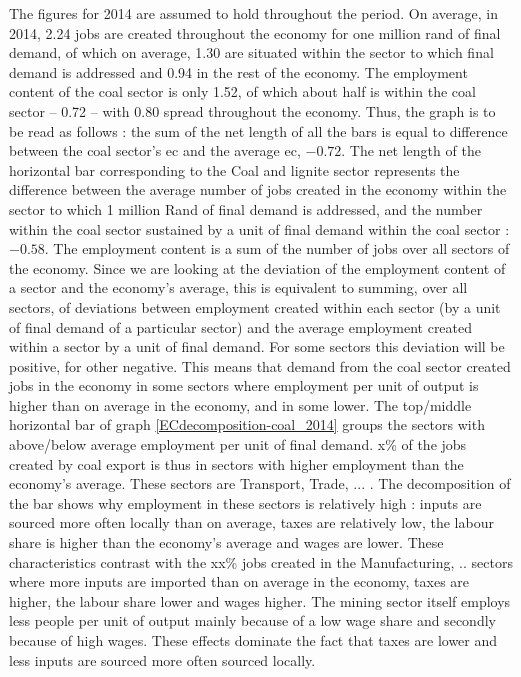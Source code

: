 \documentclass[12pt,english]{article}
\begin{document}
The figures for 2014 are assumed to hold throughout the period. On average, in 2014, 2.24 jobs are created throughout the economy for one million rand of final demand, of which on average, 1.30 are situated within the sector to which final demand is addressed and 0.94 in the rest of the economy. The employment content of the coal sector is only 1.52, of which about half is within the coal sector -- 0.72 -- with 0.80 spread throughout the economy. Thus, the graph is to be read as follows : the sum of the net length of all the bars is equal to difference between the coal sector's ec and the average ec, $-0.72$. The net length of the horizontal bar corresponding to the Coal and lignite sector represents the difference between the average number of jobs created in the economy within the sector to which 1 million Rand of final demand is addressed, and the number within the coal sector sustained by a unit of final demand within the coal sector : $-0.58$. The employment content is a sum of the number of jobs over all sectors of the economy. Since we are looking at the deviation of the employment content of a sector and the economy's average, this is equivalent to summing, over all sectors, of deviations between employment created within each sector (by a unit of final demand of a particular sector) and the average employment created within a sector by a unit of final demand. For some sectors this deviation will be positive, for other negative. This means that demand from the coal sector created jobs in the economy in some sectors where employment per unit of output is higher than on average in the economy, and in some lower. The top/middle horizontal bar of graph \ref{ECdecomposition-coal_2014} groups the sectors with above/below average employment per unit of final demand. x\% of the jobs created by coal export is thus in sectors with higher employment than the economy's average. These sectors are Transport, Trade, ... . The decomposition of the bar shows why employment in these sectors is relatively high : inputs are sourced more often locally than on average, taxes are relatively low, the labour share is higher than the economy's average and wages are lower. These characteristics contrast with the xx\% jobs created in the Manufacturing, .. sectors where more inputs are imported than on average in the economy, taxes are higher, the labour share lower and wages higher. The mining sector itself employs less people per unit of output mainly because of a low wage share and secondly because of high wages. These effects dominate the fact that taxes are lower and less inputs are sourced more often sourced locally.
\end{document}
